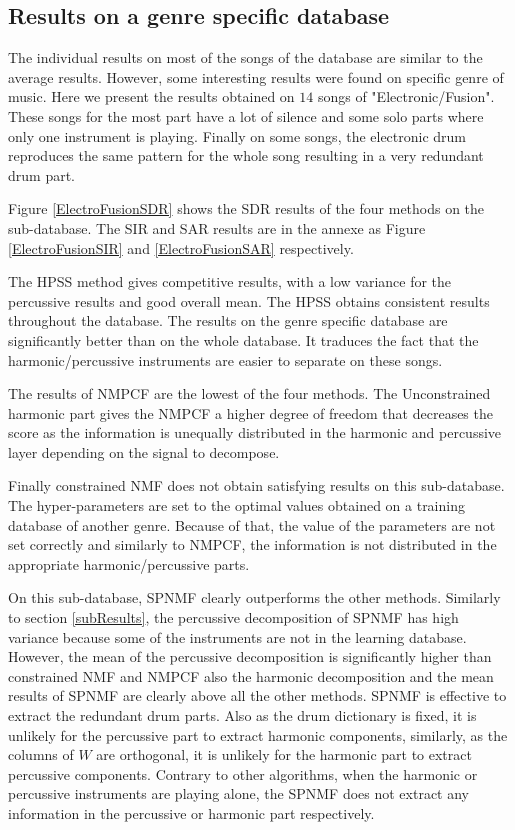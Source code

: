\documentclass[journal]{IEEEtran}
\begin{document}
\subsection{Results on a genre specific database}\label{sec:subdata}

The individual results on most of the songs of the database are similar to the average results. However, some interesting results were found on specific genre of music. Here we present the results obtained on $14$ songs of "Electronic/Fusion". These songs for the most part have a lot of silence and some solo parts where only one instrument is playing. Finally on some songs, the electronic drum reproduces the same pattern for the whole song resulting in a very redundant drum part.

Figure \ref{ElectroFusionSDR} shows the SDR results of the four methods on the sub-database. The SIR and SAR results are in the annexe as Figure \ref{ElectroFusionSIR} and \ref{ElectroFusionSAR} respectively. 


The HPSS method gives competitive results, with a low variance for the percussive results and good overall mean. The HPSS obtains consistent results throughout the database. The results on the genre specific database are significantly better than on the whole database. It traduces the fact that the harmonic/percussive instruments are easier to separate on these songs. 
 
The results of NMPCF are the lowest of the four methods. The Unconstrained harmonic part gives the NMPCF a higher degree of freedom that decreases the score as the information is unequally distributed in the harmonic and percussive layer depending on the signal to decompose. 

Finally constrained NMF does not obtain satisfying results on this sub-database. The hyper-parameters are set to the optimal values obtained on a training database of another genre. Because of that, the value of the parameters are not set correctly and similarly to NMPCF, the information is not distributed in the appropriate harmonic/percussive parts. 


On this sub-database, SPNMF clearly outperforms the other methods. Similarly to section \ref{subResults}, the percussive decomposition of SPNMF has high variance because some of the instruments are not in the learning database. However, the mean of the percussive decomposition is significantly higher than constrained NMF and NMPCF also the harmonic decomposition and the mean results of SPNMF are clearly above all the other methods. SPNMF is effective to extract the redundant drum parts. Also as the drum dictionary is fixed, it is unlikely for the percussive part to extract harmonic components, similarly, as the columns of $W$ are orthogonal, it is unlikely for the harmonic part to extract percussive components. Contrary to other algorithms, when the harmonic or percussive instruments are playing alone, the SPNMF does not extract any information in the percussive or harmonic part respectively.
\end{document}
